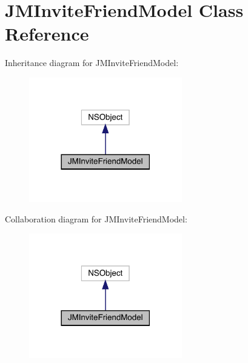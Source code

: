 \hypertarget{interface_j_m_invite_friend_model}{}\section{J\+M\+Invite\+Friend\+Model Class Reference}
\label{interface_j_m_invite_friend_model}


Inheritance diagram for J\+M\+Invite\+Friend\+Model\+:\nopagebreak
\begin{figure}[H]
\begin{center}
\leavevmode
\includegraphics[width=189pt]{interface_j_m_invite_friend_model__inherit__graph}
\end{center}
\end{figure}


Collaboration diagram for J\+M\+Invite\+Friend\+Model\+:\nopagebreak
\begin{figure}[H]
\begin{center}
\leavevmode
\includegraphics[width=189pt]{interface_j_m_invite_friend_model__coll__graph}
\end{center}
\end{figure}
